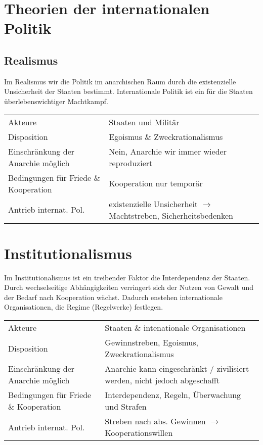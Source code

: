\documentclass{article}
\begin{document}
\section*{Theorien der internationalen Politik}
\subsection*{Realismus}
Im Realismus wir die Politik im anarchischen Raum durch die existenzielle Unsicherheit der Staaten bestimmt.
Internationale Politik ist ein für die Staaten überlebenswichtiger Machtkampf.
\begin{center}
    \begin{tabular}{p{} p{}}
        Akteure                               & Staaten und Militär                                                        \\
        Disposition                           & Egoismus \& Zweckrationalismus                                             \\
        Einschränkung der Anarchie möglich    & Nein, Anarchie wir immer wieder reproduziert                               \\
        Bedingungen für Friede \& Kooperation & Kooperation nur temporär                                                   \\
        Antrieb internat. Pol.                & existenzielle Unsicherheit $\rightarrow$ Machtstreben, Sicherheitsbedenken
    \end{tabular}
\end{center}
\section*{Institutionalismus}
Im Institutionalismus ist ein treibender Faktor die Interdependenz der Staaten.
Durch wechselseitige Abhängigkeiten verringert sich der Nutzen von Gewalt und der Bedarf nach Kooperation
wächst. Dadurch enstehen internationale Organisationen, die Regime (Regelwerke) festlegen.
\begin{center}
    \begin{tabular}{p{} p{}}
        Akteure                               & Staaten \& intenationale Organisationen                                    \\
        Disposition                           & Gewinnstreben, Egoismus, Zweckrationalismus                                \\
        Einschränkung der Anarchie möglich    & Anarchie kann eingeschränkt / zivilisiert werden, nicht jedoch abgeschafft \\
        Bedingungen für Friede \& Kooperation & Interdependenz, Regeln, Überwachung und Strafen                            \\
        Antrieb internat. Pol.                & Streben nach abs. Gewinnen $\rightarrow$ Kooperationswillen
    \end{tabular}
\end{center}
\end{document}
